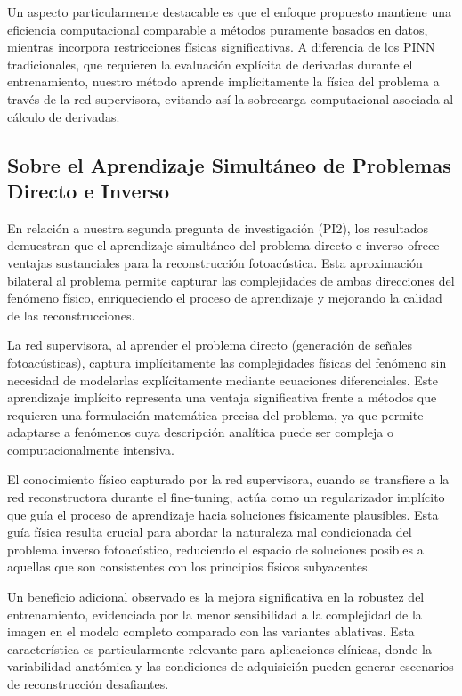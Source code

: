 Un aspecto particularmente destacable es que el enfoque propuesto mantiene una eficiencia computacional comparable a métodos puramente basados en datos, mientras incorpora restricciones físicas significativas. A diferencia de los PINN tradicionales, que requieren la evaluación explícita de derivadas durante el entrenamiento, nuestro método aprende implícitamente la física del problema a través de la red supervisora, evitando así la sobrecarga computacional asociada al cálculo de derivadas.

\subsection{Sobre el Aprendizaje Simultáneo de Problemas Directo e Inverso}

En relación a nuestra segunda pregunta de investigación (PI2), los resultados demuestran que el aprendizaje simultáneo del problema directo e inverso ofrece ventajas sustanciales para la reconstrucción fotoacústica. Esta aproximación bilateral al problema permite capturar las complejidades de ambas direcciones del fenómeno físico, enriqueciendo el proceso de aprendizaje y mejorando la calidad de las reconstrucciones.

La red supervisora, al aprender el problema directo (generación de señales fotoacústicas), captura implícitamente las complejidades físicas del fenómeno sin necesidad de modelarlas explícitamente mediante ecuaciones diferenciales. Este aprendizaje implícito representa una ventaja significativa frente a métodos que requieren una formulación matemática precisa del problema, ya que permite adaptarse a fenómenos cuya descripción analítica puede ser compleja o computacionalmente intensiva.

El conocimiento físico capturado por la red supervisora, cuando se transfiere a la red reconstructora durante el fine-tuning, actúa como un regularizador implícito que guía el proceso de aprendizaje hacia soluciones físicamente plausibles. Esta guía física resulta crucial para abordar la naturaleza mal condicionada del problema inverso fotoacústico, reduciendo el espacio de soluciones posibles a aquellas que son consistentes con los principios físicos subyacentes.

Un beneficio adicional observado es la mejora significativa en la robustez del entrenamiento, evidenciada por la menor sensibilidad a la complejidad de la imagen en el modelo completo comparado con las variantes ablativas. Esta característica es particularmente relevante para aplicaciones clínicas, donde la variabilidad anatómica y las condiciones de adquisición pueden generar escenarios de reconstrucción desafiantes.

